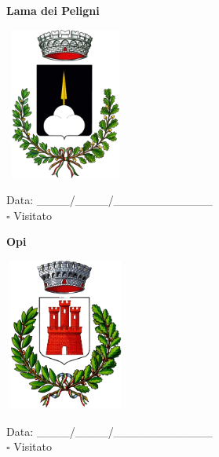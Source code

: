\documentclass[a5paper,12pt]{article}
\begin{document}
\vspace{0.7cm}

\noindent
\begin{minipage}[t]{0.45\textwidth}
    \begin{center}
        \textbf{Lama dei Peligni}
    \end{center}
    \vspace{-0.5cm} %
    \begin{center}
        \includegraphics[height= 5cm, width=4cm]{Abruzzo/Lama_dei_Peligni-Stemma.png}
    \end{center}
    \vspace{-0.4cm} %
    \begin{flushleft}
        Data: \_\_\_\_/\_\_\_\_/\_\_\_\_\_\_\_\_\_\_\_\_ \\
        $\square$ Visitato
    \end{flushleft}
\end{minipage}
\hfill
\noindent
\begin{minipage}[t]{0.45\textwidth}
    \begin{center}
        \textbf{Opi}
    \end{center}
    \vspace{-0.5cm} %
    \begin{center}
        \includegraphics[height= 5cm, width=4cm]{Abruzzo/Opi-Stemma.png}
    \end{center}
    \vspace{-0.4cm} %
    \begin{flushleft}
        Data: \_\_\_\_/\_\_\_\_/\_\_\_\_\_\_\_\_\_\_\_\_ \\
        $\square$ Visitato
    \end{flushleft}
\end{minipage}
\end{document}
